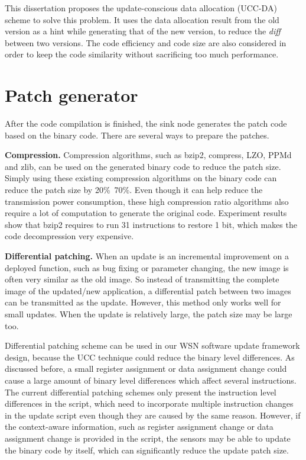 This dissertation proposes the update-conscious data allocation (UCC-DA) scheme to solve this problem.
It uses the data allocation result from the old version as a hint while generating that of the new version, to reduce the {\it diff} between two versions.
The code efficiency and code size are also considered in order to keep the code similarity without sacrificing too much performance.


\section{Patch generator}

After the code compilation is finished, the sink node generates the patch code based on the binary code. There are several ways to prepare the patches.

\textbf{Compression.}
Compression algorithms, such as bzip2, compress, LZO, PPMd and zlib, can be used on the generated binary code to reduce the patch size. Simply using these existing compression algorithms on the binary code can reduce the patch size by 20\%~70\%. Even though it can help reduce the transmission power consumption, these high compression ratio algorithms also require a lot of computation to generate the original code. Experiment results~\cite{related:barr-energy} show that bzip2 requires to run 31 instructions to restore 1 bit, which makes the code decompression very expensive.

\textbf{Differential patching.}
When an update is an incremental improvement on a deployed function, such as bug fixing or parameter changing, the new image is often very similar as the old image. So instead of transmitting the complete image of the updated/new application, a differential patch between two images can be transmitted as the update. 
However, this method only works well for small updates. When the update is relatively large, the patch size may be large too.

Differential patching scheme can be used in our WSN software update framework design, because the UCC technique could reduce the binary level differences. As discussed before, a small register assignment or data assignment change could cause a large amount of binary level differences which affect several instructions. The current differential patching schemes only present the instruction level differences in the script, which need to incorporate multiple instruction changes in the update script even though they are caused by the same reason. However, if the context-aware information, such as register assignment change or data assignment change is provided in the script, the sensors may be able to update the binary code by itself, which can significantly reduce the update patch size.

